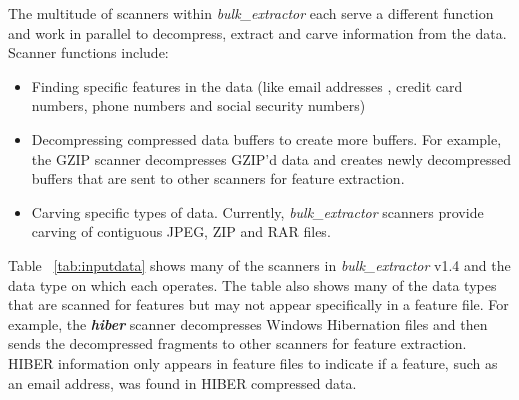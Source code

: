 \documentclass[DIV=calc, paper=a4, fontsize=11pt]{article}	 %
\newcommand \bulk {\textit{bulk\_extractor}\xspace}
\begin{document}
\noindent
The multitude of scanners within \bulk each serve a different function and work in parallel to decompress, extract and carve information from the data. Scanner functions include:
\begin{itemize}
\item Finding specific features in the data (like email addresses , credit card numbers, phone numbers and social security numbers)
\item Decompressing compressed data buffers to create more buffers. For example, the GZIP scanner decompresses GZIP'd data and creates newly decompressed buffers that are sent to other scanners for feature extraction.
\item Carving specific types of data. Currently, \bulk scanners provide carving of contiguous JPEG, ZIP and RAR files. 
\end{itemize}
Table ~\ref{tab:inputdata} shows many of the scanners in \bulk v1.4 and the data type on which each operates. The table also shows many of the data types that are scanned for features but may not appear specifically in a feature file.  For example, the \textbf{\textit{hiber}} scanner decompresses Windows Hibernation files and then sends the decompressed fragments to other scanners for feature extraction. HIBER information only appears in feature files to indicate if a feature, such as an email address, was found in HIBER compressed data. \\
\end{document}
